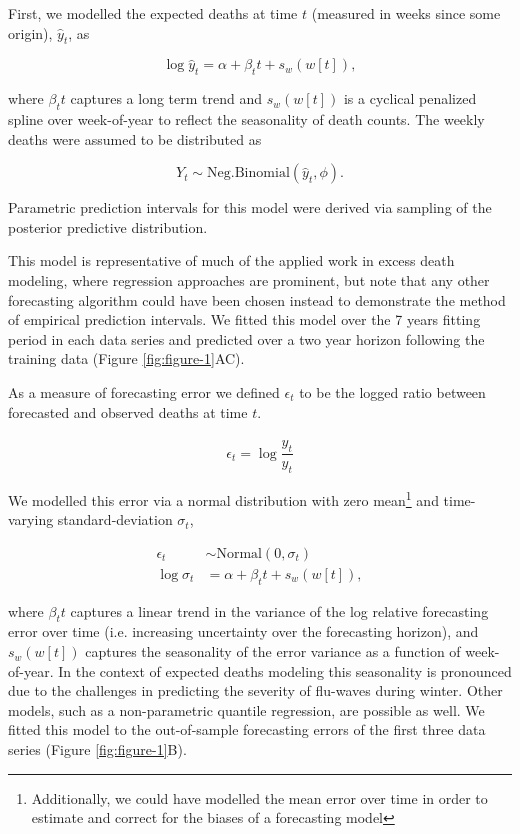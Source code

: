 \documentclass[12pt]{article}
\begin{document}
First, we modelled the expected deaths at time $t$ (measured in weeks since some origin), $\hat y_t$, as

\begin{equation*}
  \log \hat y_t = \alpha + \beta_tt + s_w(w[t]),
\end{equation*}

where $\beta_tt$ captures a long term trend and $s_w(w[t])$ is a cyclical penalized spline over week-of-year to reflect the seasonality of death counts. The weekly deaths were assumed to be distributed as

\begin{equation*}
  Y_t \sim \mathrm{Neg.Binomial}(\hat y_t, \phi).
\end{equation*}

Parametric prediction intervals for this model were derived via sampling of the posterior predictive distribution.

This model is representative of much of the applied work in excess death modeling, where regression approaches are prominent, but note that any other forecasting algorithm could have been chosen instead to demonstrate the method of empirical prediction intervals. We fitted this model over the 7 years fitting period in each data series and predicted over a two year horizon following the training data (Figure \ref{fig:figure-1}AC).

As a measure of forecasting error we defined $\epsilon_t$ to be the logged ratio between forecasted and observed deaths at time $t$.

\begin{equation*}
\epsilon_t = \log\frac{\hat y_t} {y_t}
\end{equation*}

We modelled this error via a normal distribution with zero mean\footnote{Additionally, we could have modelled the mean error over time in order to estimate and correct for the biases of a forecasting model} and time-varying standard-deviation $\sigma_t$,

\begin{align*}
    \epsilon_t &\sim \mathrm{Normal}(0, \sigma_t) \\
    \log \sigma_t &= \alpha + \beta_tt + s_w(w[t]),
\end{align*}

where $\beta_tt$ captures a linear trend in the variance of the log relative forecasting error over time (i.e. increasing uncertainty over the forecasting horizon), and $s_w(w[t])$ captures the seasonality of the error variance as a function of week-of-year. In the context of expected deaths modeling this seasonality is pronounced due to the challenges in predicting the severity of flu-waves during winter. Other models, such as a non-parametric quantile regression, are possible as well. We fitted this model to the out-of-sample forecasting errors of the first three data series (Figure \ref{fig:figure-1}B).
\end{document}
